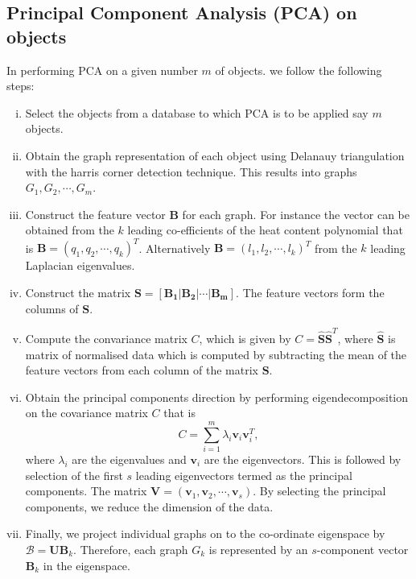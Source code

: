 \documentclass[10pt,a4paper]{article}
\begin{document}
\subsection{Principal Component Analysis (PCA) on objects}
In performing PCA on a given number $m$ of objects. we follow the following steps:
\begin{enumerate}[i)]
	\item Select the objects from a database to which PCA is to be applied say $m$ objects.
	\item Obtain the graph representation of each object using Delanauy triangulation with the harris corner detection technique. This results into graphs $G_1, G_2, \cdots, G_m$.
	\item Construct the feature vector $\mathbf{B}$ for each graph. For instance the vector can be obtained from the $k$ leading co-efficients of the heat content polynomial that is $\mathbf{B} = (q_1,q_2, \cdots, q_k)^T$. Alternatively $\mathbf{B} = (l_1, l_2, \cdots, l_k)^T$ from the $k$ leading Laplacian eigenvalues.
	\item Construct the matrix $\mathbf{S}=[ \mathbf{B_1}|\mathbf{B_2}| \cdots | \mathbf{B_m}]$. The feature vectors form the columns of $\mathbf{S}$.
	\item Compute the convariance matrix $C$, which is given by $C = \hat{\mathbf{S}} \hat{\mathbf{S}}^T$, where $\hat{\mathbf{S}}$ is matrix of normalised data which is computed by subtracting the mean of the feature vectors from each column of the matrix $\mathbf{S}$.
	\item Obtain the principal components direction by performing eigendecomposition on the covariance matrix $C$ that is 
	\begin{equation}
	C = \sum _{i=1} ^m \lambda_i \mathbf{v}_i \mathbf{v}_i^T,
	\end{equation}
	where $\lambda_i$ are the eigenvalues and $\mathbf{v}_i$ are the eigenvectors. This is followed by selection of the first $s$ leading eigenvectors termed as the principal components. The matrix $\mathbf{V} = (\mathbf{v}_1, \mathbf{v}_2, \cdots, \mathbf{v}_s)$. By selecting the principal components, we reduce the dimension of the data.
	\item Finally, we project individual graphs on to the co-ordinate eigenspace by $\mathcal{B} = \mathbf{U} \mathbf{B}_k$. Therefore, each graph $G_k$ is represented by an $s$-component vector $\mathbf{B}_k$ in the eigenspace.
	 
\end{enumerate}
\renewcommand{\bibname}{References}
\nocite{*}


\end{document}
